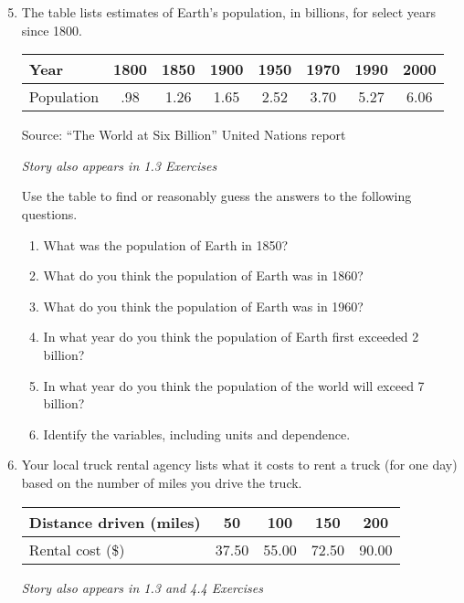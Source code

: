 \begin{enumerate} 
\setcounter{enumi}{4}

\item The table lists estimates of Earth's population, in billions, for select years since 1800.   
\begin{center}
\begin{tabular} {|l ||c |c |c |c |c |c |c |} \hline
Year & 1800 & 1850 & 1900 & 1950 & 1970 & 1990 & 2000 \\ \hline
Population & .98 & 1.26 & 1.65 & 2.52 & 3.70 & 5.27 & 6.06  \\ \hline
\end{tabular}
\end{center}
\hfill \begin{footnotesize} Source:  ``The World at Six Billion'' United Nations report\end{footnotesize}

 \hfill \emph{Story also appears in 1.3 Exercises}
 
Use the table to find or reasonably guess the answers to the following questions.
\begin{enumerate}
\item What was the population of Earth in 1850?
\item What do you think the population of Earth was in 1860?
\item What do you think the population of Earth was in 1960?
\item In what year do you think the population of Earth first exceeded 2 billion?
\item In what year do you think the population of the world will exceed 7 billion?
\item Identify the variables, including units and dependence.
\end{enumerate}  

\item Your local truck rental agency lists what it costs to rent a truck (for one day) based on the number of miles you drive the truck.
\begin{center}
\begin{tabular} {|l ||c |c|c|c|} \hline
Distance driven (miles) & 50 & 100 & 150 & 200 \\ \hline
Rental cost (\$) & 37.50 & 55.00 & 72.50 & 90.00 \\ \hline
\end{tabular}
\end{center}
 \hfill \emph{Story also appears in 1.3 and 4.4 Exercises}
 

\end{enumerate}
